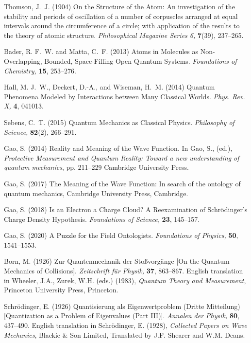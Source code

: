 \documentclass[12pt,onecolumn,secnumarabic,amsmath,amssymb,balancelastpage,nofootinbib]{article}
\begin{document}
\begin{thebibliography}{100}

Thomson, J.~J. (1904)
On the Structure of the Atom: An investigation of the stability and periods of
  oscillation of a number of corpuscles arranged at equal intervals around the
  circumference of a circle; with application of the results to the theory of
  atomic structure.
{\em Philosophical Magazine Series 6,} {\bf 7}(39), 237--265.

Bader, R. F.~W. and Matta, C.~F. (2013)
Atoms in Molecules as Non-Overlapping, Bounded, Space-Filling Open Quantum
  Systems.
{\em Foundations of Chemistry,} {\bf 15}, 253--276.

Hall, M. J.~W., Deckert, D.-A., and Wiseman, H.~M. (2014)
Quantum Phenomena Modeled by Interactions between Many Classical Worlds.
{\em Phys. Rev. X,} {\bf 4}, 041013.

Sebens, C.~T. (2015)
Quantum Mechanics as Classical Physics.
{\em Philosophy of Science,} {\bf 82}(2), 266--291.

Gao, S. (2014)
Reality and Meaning of the Wave Function.
In Gao, S., (ed.), \emph{Protective Measurement and Quantum Reality: Toward a
  new understanding of quantum mechanics},  pp. 211--229 Cambridge University
  Press.

Gao, S. (2017)
The Meaning of the Wave Function: In search of the ontology of quantum
  mechanics,
Cambridge University Press, Cambridge.

Gao, S. (2018)
Is an Electron a Charge Cloud? A Reexamination of Schr\"{o}dinger's Charge
  Density Hypothesis.
{\em Foundations of Science,} {\bf 23}, 145--157.

Gao, S. (2020)
A Puzzle for the Field Ontologists.
{\em Foundations of Physics,} {\bf 50}, 1541--1553.

Born, M. (1926)
Zur Quantenmechanik der Sto{\ss}vorg\"{a}nge [On the Quantum Mechanics of
  Collisions].
{\em Zeitschrift f\"{u}r Physik,} {\bf 37}, 863--867.
English translation in Wheeler, J.A., Zurek, W.H. (eds.) (1983),
  \textit{Quantum Theory and Measurement}, Princeton University Press,
  Princeton.

Schr{\"o}dinger, E. (1926)
Quantisierung als Eigenwertproblem (Dritte Mitteilung) [Quantization as a
  Problem of Eigenvalues (Part III)].
{\em Annalen der Physik,} {\bf 80}, 437--490.
English translation in Schr{\"o}dinger, E. (1928), \textit{Collected Papers on
  Wave Mechanics}, Blackie \& Son Limited, Translated by J.F. Shearer and W.M.
  Deans.


\end{thebibliography}
\end{document}

